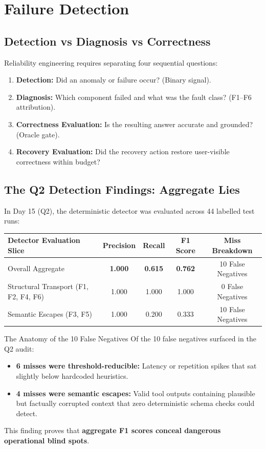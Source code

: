 \vspace{12pt}
\section{Failure Detection}

\subsection{Detection vs Diagnosis vs Correctness}
Reliability engineering requires separating four sequential questions:
\begin{enumerate}
    \item \textbf{Detection:} Did an anomaly or failure occur? (Binary signal).
    \item \textbf{Diagnosis:} Which component failed and what was the fault class? (F1--F6 attribution).
    \item \textbf{Correctness Evaluation:} Is the resulting answer accurate and grounded? (Oracle gate).
    \item \textbf{Recovery Evaluation:} Did the recovery action restore user-visible correctness within budget?
\end{enumerate}

\subsection{The Q2 Detection Findings: Aggregate Lies}
In Day 15 (Q2), the deterministic detector was evaluated across 44 labelled test runs:
\begin{center}
\small
\begin{tabularx}{\textwidth}{p{}cccc}
\toprule
\textbf{Detector Evaluation Slice} & \textbf{Precision} & \textbf{Recall} & \textbf{F1 Score} & \textbf{Miss Breakdown} \\
\midrule
Overall Aggregate & \textbf{1.000} & \textbf{0.615} & \textbf{0.762} & 10 False Negatives \\
Structural Transport (F1, F2, F4, F6) & 1.000 & 1.000 & 1.000 & 0 False Negatives \\
Semantic Escapes (F3, F5) & 1.000 & 0.200 & 0.333 & 10 False Negatives \\
\bottomrule
\end{tabularx}
\end{center}

\begin{callout}[accent]{The Anatomy of the 10 False Negatives}
Of the 10 false negatives surfaced in the Q2 audit:
\begin{itemize}
    \item \textbf{6 misses were threshold-reducible:} Latency or repetition spikes that sat slightly below hardcoded heuristics.
    \item \textbf{4 misses were semantic escapes:} Valid tool outputs containing plausible but factually corrupted context that zero deterministic schema checks could detect.
\end{itemize}
This finding proves that \textbf{aggregate F1 scores conceal dangerous operational blind spots}.
\end{callout}
